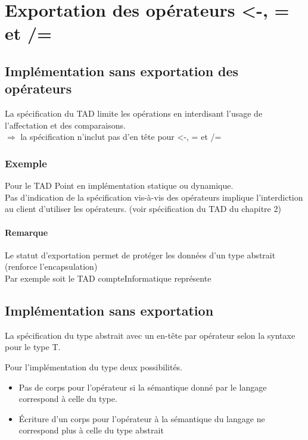 \section{Exportation des opérateurs <-, = et /=}
	\subsection{Implémentation sans exportation des opérateurs}
		La spécification du TAD limite les opérations en interdisant l'usage de l'affectation et des 
		comparaisons.\\
		$\Rightarrow$ la spécification n'inclut pas d'en tête pour <-, = et /=
		\subsubsection{Exemple}
			Pour le TAD Point en implémentation statique ou dynamique. \\
			Pas d'indication de la spécification vis-à-vis des opérateurs implique l'interdiction au client
			d'utiliser les opérateurs. (voir spécification du TAD du chapitre 2) 
			
		\paragraph{Remarque} 
			Le statut d'exportation permet de protéger les données d'un type abstrait 
			(renforce l'encapsulation)\\
			Par exemple soit le TAD compteInformatique représente
			
	\subsection{Implémentation sans exportation}
		La spécification du type abstrait avec un en-tête par opérateur selon la syntaxe pour le type T.	
			
			
			Pour l'implémentation du type deux possibilités.
			\begin{itemize}
				\item Pas de corps pour l'opérateur si la sémantique donné par le langage correspond à
					celle du type.
				\item Écriture d'un corps pour l'opérateur à la sémantique du langage ne correspond plus
					à celle du type abstrait
			\end{itemize}	
